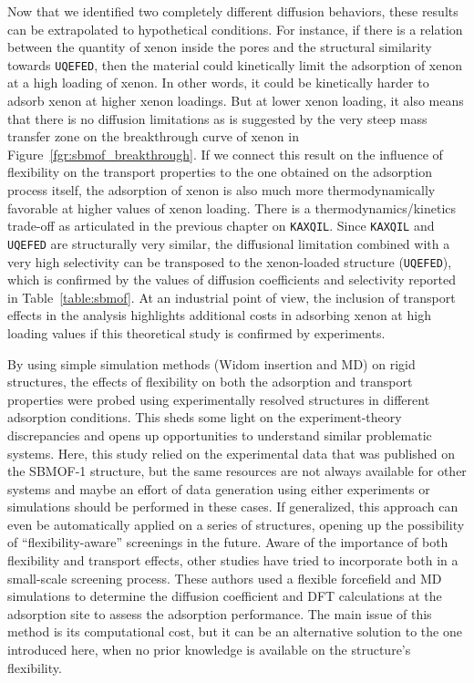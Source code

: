 \documentclass[main]{subfiles}
\begin{document}
Now that we identified two completely different diffusion behaviors, these results can be extrapolated to hypothetical conditions. For instance, if there is a relation between the quantity of xenon inside the pores and the structural similarity towards \texttt{UQEFED}, then the material could kinetically limit the adsorption of xenon at a high loading of xenon. In other words, it could be kinetically harder to adsorb xenon at higher xenon loadings. But at lower xenon loading, it also means that there is no diffusion limitations as is suggested by the very steep mass transfer zone on the breakthrough curve of xenon in Figure~\ref{fgr:sbmof_breakthrough}. If we connect this result on the influence of flexibility on the transport properties to the one obtained on the adsorption process itself, the adsorption of xenon is also much more thermodynamically favorable at higher values of xenon loading. There is a thermodynamics/kinetics trade-off as articulated in the previous chapter on \texttt{KAXQIL}. Since \texttt{KAXQIL} and \texttt{UQEFED} are structurally very similar, the diffusional limitation combined with a very high selectivity can be transposed to the xenon-loaded structure (\texttt{UQEFED}), which is confirmed by the values of diffusion coefficients and selectivity reported in Table~\ref{table:sbmof}. At an industrial point of view, the inclusion of transport effects in the analysis highlights additional costs in adsorbing xenon at high loading values if this theoretical study is confirmed by experiments.

By using simple simulation methods (Widom insertion and MD) on rigid structures, the effects of flexibility on both the adsorption and transport properties were probed using experimentally resolved structures in different adsorption conditions. This sheds some light on the experiment-theory discrepancies and opens up opportunities to understand similar problematic systems. Here, this study relied on the experimental data that was published on the SBMOF-1 structure, but the same resources are not always available for other systems and maybe an effort of data generation using either experiments or simulations should be performed in these cases. If generalized, this approach can even be automatically applied on a series of structures, opening up the possibility of ``flexibility-aware'' screenings in the future. Aware of the importance of both flexibility and transport effects, other studies have tried to incorporate both in a small-scale screening process.\autocite{Stanton_2022} These authors used a flexible forcefield and MD simulations to determine the diffusion coefficient and DFT calculations at the adsorption site to assess the adsorption performance. The main issue of this method is its computational cost, but it can be an alternative solution to the one introduced here, when no prior knowledge is available on the structure’s flexibility. 
\end{document}
